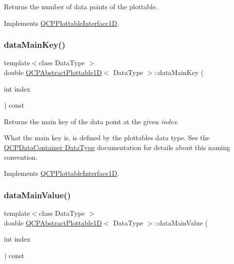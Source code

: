 Returns the number of data points of the plottable. 

Implements \hyperlink{class_q_c_p_plottable_interface1_d_a058a22c770ef4d5a0e878a7f02183da9}{Q\+C\+P\+Plottable\+Interface1D}.

\mbox{\label{class_q_c_p_abstract_plottable1_d_aeb156ebf5d3c8de906b428be30733ad8}} 
\subsubsection{\texorpdfstring{data\+Main\+Key()}{dataMainKey()}}
{\footnotesize\ttfamily template$<$class Data\+Type $>$ \\
double \hyperlink{class_q_c_p_abstract_plottable1_d}{Q\+C\+P\+Abstract\+Plottable1D}$<$ Data\+Type $>$\+::data\+Main\+Key (\begin{DoxyParamCaption}\item[{int}]{index }\end{DoxyParamCaption}) const\hspace{0.3cm}{\ttfamily [virtual]}}





Returns the main key of the data point at the given {\itshape index}.

What the main key is, is defined by the plottable\textquotesingle{}s data type. See the \hyperlink{class_q_c_p_data_container_qcpdatacontainer-datatype}{Q\+C\+P\+Data\+Container Data\+Type} documentation for details about this naming convention. 

Implements \hyperlink{class_q_c_p_plottable_interface1_d_a2bd60daaac046945fead558cbd83cf73}{Q\+C\+P\+Plottable\+Interface1D}.

\mbox{\label{class_q_c_p_abstract_plottable1_d_a6be0f657ba85a1688336d76ad649ecf2}} 
\subsubsection{\texorpdfstring{data\+Main\+Value()}{dataMainValue()}}
{\footnotesize\ttfamily template$<$class Data\+Type $>$ \\
double \hyperlink{class_q_c_p_abstract_plottable1_d}{Q\+C\+P\+Abstract\+Plottable1D}$<$ Data\+Type $>$\+::data\+Main\+Value (\begin{DoxyParamCaption}\item[{int}]{index }\end{DoxyParamCaption}) const\hspace{0.3cm}{\ttfamily [virtual]}}





